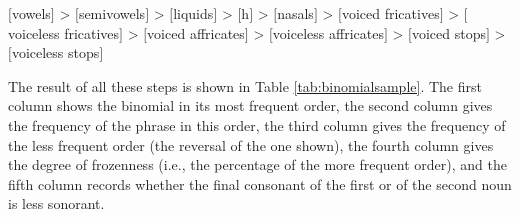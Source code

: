 \begin{exe}
\ex $[$vowels$]$ > $[$semivowels$]$ > $[$liquids$]$ > $[$h$]$ > $[$nasals$]$ > $[$voiced fricatives$]$ > $[$voiceless fricatives$]$ > $[$voiced affricates$]$ > $[$voiceless affricates$]$ > $[$voiced stops$]$ > $[$voiceless stops$]$ 
\label{ex:sonorityhierarchy}
\end{exe}

The result of all these steps is shown in Table \ref{tab:binomialsample}. The first column shows the binomial in its most frequent order, the second column gives the frequency of the phrase in this order, the third column gives the frequency of the less frequent order (the reversal of the one shown), the fourth column gives the degree of frozenness (i.e., the percentage of the more frequent order), and the fifth column records whether the final consonant of the first or of the second noun is less sonorant.

